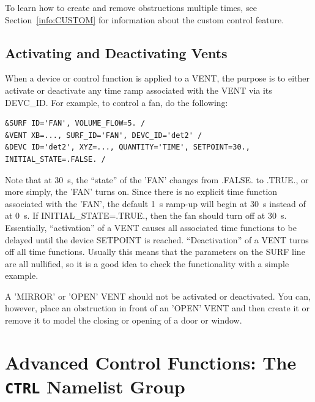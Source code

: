 \documentclass[11pt]{book}
\begin{document}
To learn how to create and remove obstructions multiple times, see Section~\ref{info:CUSTOM} for information about the custom control feature.



\subsection{Activating and Deactivating Vents}
\label{info:activate_deactivate}

When a device or control function is applied to a {\ct VENT}, the purpose is to either activate or deactivate any time ramp associated with
the {\ct VENT} via its {\ct DEVC\_ID}. For example, to control a fan, do the following:
\begin{lstlisting}
&SURF ID='FAN', VOLUME_FLOW=5. /
&VENT XB=..., SURF_ID='FAN', DEVC_ID='det2' /
&DEVC ID='det2', XYZ=..., QUANTITY='TIME', SETPOINT=30., INITIAL_STATE=.FALSE. /
\end{lstlisting}
Note that at 30~s, the ``state'' of the {\ct 'FAN'} changes from {\ct .FALSE.} to {\ct .TRUE.}, or more simply, the {\ct 'FAN'} turns on. Since there
is no explicit time function associated with the {\ct 'FAN'}, the default 1~s ramp-up will begin at 30~s instead of at 0~s. If {\ct INITIAL\_STATE=.TRUE.}, then the fan should turn off at 30~s. Essentially, ``activation'' of a {\ct VENT} causes all associated
time functions to be delayed until the device {\ct SETPOINT} is reached. ``Deactivation'' of a {\ct VENT} turns off all time functions. Usually this means
that the parameters on the {\ct SURF} line are all nullified, so it is a good idea to check the functionality with a simple example.



A {\ct 'MIRROR'} or {\ct 'OPEN'} {\ct VENT} should not be activated or deactivated.
You can, however, place an obstruction in front of an {\ct 'OPEN'} {\ct VENT} and then create it or remove it to model the closing or opening of a door or
window.






\section{Advanced Control Functions: The \texorpdfstring{{\tt CTRL}}{CTRL} Namelist Group}
\label{info:CTRL}
\end{document}
